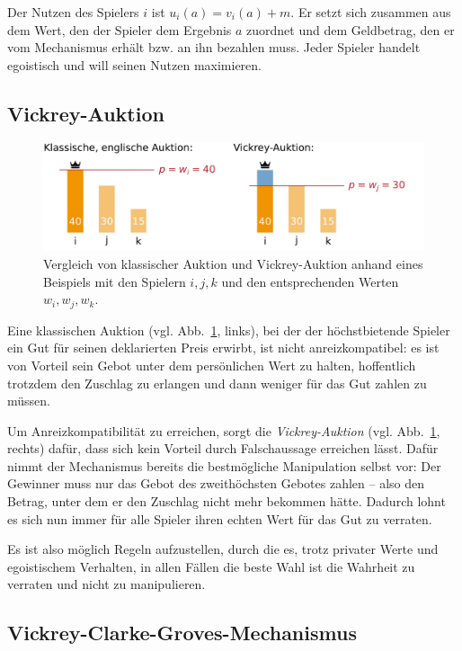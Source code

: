 \documentclass[a4paper,11pt]{article}
\theoremstyle{definition}
\theoremstyle{plain}
\theoremstyle{definition}
\begin{document}
Der Nutzen des Spielers $i$ ist $u_i(a) = v_i(a) + m$. Er setzt sich zusammen aus dem Wert, den der Spieler dem Ergebnis $a$ zuordnet und dem Geldbetrag, den er vom Mechanismus erhält bzw. an ihn bezahlen muss. Jeder Spieler handelt egoistisch und will seinen Nutzen maximieren.

\subsection{Vickrey-Auktion}
\begin{figure}
	\centering
	\includegraphics[width=\textwidth]{img/vickrey-auktion.pdf}
	\caption{Vergleich von klassischer Auktion und Vickrey-Auktion anhand eines Beispiels mit den Spielern $i,j,k$ und den entsprechenden Werten $w_i,w_j,w_k$.}
	\label{fig:vickAukt}
\end{figure}

Eine klassischen Auktion (vgl. Abb.~\ref{fig:vickAukt}, links), bei der der höchstbietende Spieler ein Gut für seinen deklarierten Preis erwirbt, ist nicht anreizkompatibel: es ist von Vorteil sein Gebot unter dem persönlichen Wert zu halten, hoffentlich trotzdem den Zuschlag zu erlangen und dann weniger für das Gut zahlen zu müssen.

Um Anreizkompatibilität zu erreichen, sorgt die \emph{Vickrey-Auktion} (vgl. Abb.~\ref{fig:vickAukt}, rechts) dafür, dass sich kein Vorteil durch Falschaussage erreichen lässt. Dafür nimmt der Mechanismus bereits die bestmögliche Manipulation selbst vor: Der Gewinner muss nur das Gebot des zweithöchsten Gebotes zahlen -- also den Betrag, unter dem er den Zuschlag nicht mehr bekommen hätte. Dadurch lohnt es sich nun immer für alle Spieler ihren echten Wert für das Gut zu verraten.

Es ist also möglich Regeln aufzustellen, durch die es, trotz privater Werte und egoistischem Verhalten, in allen Fällen die beste Wahl ist die Wahrheit zu verraten und nicht zu manipulieren.

\subsection{Vickrey-Clarke-Groves-Mechanismus}
\end{document}
